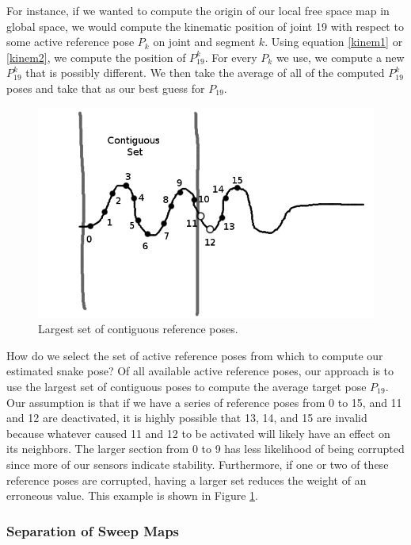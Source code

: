 For instance, if we wanted to compute the origin of our local free space map in global space, we would compute the kinematic position of joint 19 with respect to some active reference pose $P_k$ on joint and segment $k$.  Using equation \ref{kinem1} or \ref{kinem2}, we compute the position of $P^{k}_{19}$.  For every $P_k$ we use, we compute a new $P^{k}_{19}$ that is possibly different.  We then take the average of all of the computed $P^{k}_{19}$ poses and take that as our best guess for $P_{19}$. 

\begin{figure}
  \begin{center}
    \includegraphics[scale=0.6]{4_ref_averaging.png}
  \end{center}
  \caption{Largest set of contiguous reference poses.}
	\label{ref_average}
\end{figure}

How do we select the set of active reference poses from which to compute our estimated snake pose?  Of all available active reference poses, our approach is to use the largest set of contiguous poses to compute the average target pose $P_{19}$.   Our assumption is that if we have a series of reference poses from 0 to 15, and 11 and 12 are deactivated, it is highly possible that 13, 14, and 15 are invalid because whatever caused 11 and 12 to be activated will likely have an effect on its neighbors.  The larger section from 0 to 9 has less likelihood of being corrupted since more of our sensors indicate stability.  Furthermore, if one or two of these reference poses are corrupted, having a larger set reduces the weight of an erroneous value.  This example is shown in Figure \ref{ref_average}.

\subsubsection{Separation of Sweep Maps}


